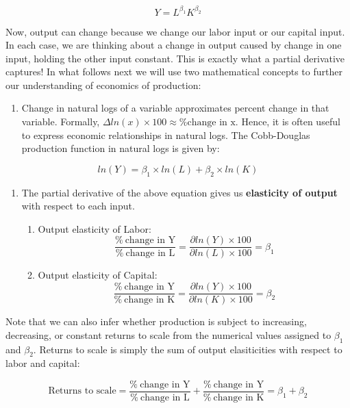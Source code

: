 \documentclass[]{book}
\providecommand{\tightlist}{%
  \setlength{\itemsep}{0pt}\setlength{\parskip}{0pt}}
\theoremstyle{definition}
\theoremstyle{definition}
\theoremstyle{definition}
\theoremstyle{remark}
\begin{document}
\[Y=L^{\beta_1}K^{\beta_2}\]

Now, output can change because we change our labor input or our capital input. In each case, we are thinking about a change in output caused by change in one input, holding the other input constant. This is exactly what a partial derivative captures! In what follows next we will use two mathematical concepts to further our understanding of economics of production:

\begin{enumerate}
\def\labelenumi{\arabic{enumi}.}
\tightlist
\item
  Change in natural logs of a variable approximates percent change in that variable. Formally, \(\Delta ln(x) \times 100 \approx \text{\% change in x}\). Hence, it is often useful to express economic relationships in natural logs. The Cobb-Douglas production function in natural logs is given by:
\end{enumerate}

\[ln(Y)=\beta_1 \times ln(L) + \beta_2 \times ln(K) \]

\begin{enumerate}
\def\labelenumi{\arabic{enumi}.}
\setcounter{enumi}{1}
\item
  The partial derivative of the above equation gives us \textbf{elasticity of output} with respect to each input.

  \begin{enumerate}
  \def\labelenumii{\alph{enumii}.}
  \item
    Output elasticity of Labor:
    \[\frac{\% \ \text{change in Y}}{\% \ \text{change in L}} = \frac{\partial ln(Y) \times 100}{ \partial ln(L) \times 100}=\beta_1\]
  \item
    Output elasticity of Capital:
    \[\frac{\% \ \text{change in Y}}{\% \ \text{change in K}} = \frac{\partial ln(Y) \times 100}{ \partial ln(K) \times 100}=\beta_2\]
  \end{enumerate}
\end{enumerate}

Note that we can also infer whether production is subject to increasing, decreasing, or constant returns to scale from the numerical values assigned to \(\beta_1\) and \(\beta_2\). Returns to scale is simply the sum of output elasiticities with respect to labor and capital:

\[\text{Returns to scale}= \frac{\% \ \text{change in Y}}{\% \  \text{change in L}}+\frac{\% \ \text{change in Y}}{\% \ \text{change in K}}=\beta_1+\beta_2\]
\end{document}
